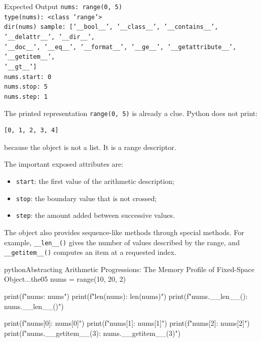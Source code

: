 \begin{iobox}{Expected Output}
\texttt{nums: range(0, 5)} \\
\texttt{type(nums): <class 'range'>} \\
\texttt{dir(nums) sample: ['\_\_bool\_\_', '\_\_class\_\_', '\_\_contains\_\_', '\_\_delattr\_\_', '\_\_dir\_\_',} \\
\texttt{'\_\_doc\_\_', '\_\_eq\_\_', '\_\_format\_\_', '\_\_ge\_\_', '\_\_getattribute\_\_', '\_\_getitem\_\_',} \\
\texttt{'\_\_gt\_\_']} \\
\texttt{nums.start: 0} \\
\texttt{nums.stop: 5} \\
\texttt{nums.step: 1} \\
\end{iobox}


The printed representation \texttt{range(0, 5)} is already a clue. Python does not print:

\begin{verbatim}
[0, 1, 2, 3, 4]
\end{verbatim}

because the object is not a list. It is a range descriptor.

The important exposed attributes are:

\begin{itemize}
    \item \texttt{start}: the first value of the arithmetic description;
    \item \texttt{stop}: the boundary value that is not crossed;
    \item \texttt{step}: the amount added between successive values.
\end{itemize}

The object also provides sequence-like methods through special methods. For example, \texttt{\_\_len\_\_()} gives the number of values described by the range, and \texttt{\_\_getitem\_\_()} computes an item at a requested index.

\begin{codebox}[]{python}{Abstracting Arithmetic Progressions: The Memory Profile of Fixed-Space Object...}{the05}
nums = range(10, 20, 2)

print(f"nums: {nums}")
print(f"len(nums): {len(nums)}")
print(f"nums.__len__(): {nums.__len__()}")

print(f"nums[0]: {nums[0]}")
print(f"nums[1]: {nums[1]}")
print(f"nums[2]: {nums[2]}")
print(f"nums.__getitem__(3): {nums.__getitem__(3)}")
\end{codebox}


